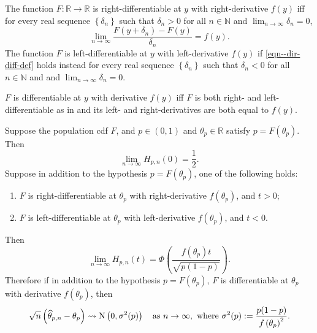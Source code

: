 \begin{definition}
\label{def--dir-diff}
The function \(F : \mathbb{R} \to \mathbb{R}\) is right-differentiable at
\(y\) with right-derivative \(f (y)\) iff for every real sequence \(\left\{
\delta_{n} \right\}\) such that \(\delta_{n} > 0\) for all \(n \in \mathbb{N}\)
and \(\lim_{n \to \infty} \delta_{n} = 0\),
\begin{equation}
  \lim_{n \to \infty} \frac{F \left( y + \delta_{n} \right) - F (y)}{\delta_{n}}
  = f (y).
  \label{eqn--dir-diff-def}
\end{equation}
The function \(F\) is left-differentiable at \(y\) with left-derivative \(f
(y)\) if \eqref{eqn--dir-diff-def} holds instead for every
real sequence \(\left\{ \delta_{n} \right\}\) such that \(\delta_{n} < 0\) for
all \(n \in \mathbb{N}\) and and \(\lim_{n \to \infty} \delta_{n} = 0\).
\end{definition}

\begin{remark}
\label{rem--diff-equiv-bi-dir-diff}
\(F\) is differentiable at \(y\) with derivative \(f (y)\) iff \(F\) is both
right- and left-differentiable as in  and its left- and
right-derivatives are both equal to \(f (y)\).
\end{remark}

\begin{theorem}
\label{thm--clt-quantile}
Suppose the population cdf \(F\), and \(p \in (0, 1)\) and \(\theta_{p} \in
\mathbb{R}\) satisfy \(p = F \left( \theta_{p} \right)\).
Then
\begin{equation}
  \lim_{n \to \infty} H_{p, n} (0) = \frac{1}{2}.
  \label{eqn--clt-quantile-0}
\end{equation}
Suppose in addition to the hypothesis \(p = F \left( \theta_{p} \right)\),
one of the following holds:
\begin{enumerate}[label=\roman*.]
  \item \(F\) is right-differentiable at \(\theta_{p}\) with right-derivative
    \(f \left( \theta_{p} \right)\), and \(t > 0\);
  \item \(F\) is left-differentiable at \(\theta_{p}\) with left-derivative \(f
    \left( \theta_{p} \right)\), and \(t < 0\).
\end{enumerate}
Then
\begin{equation}
  \lim_{n \to \infty} H_{p, n} (t) = \Phi \left( \frac{f \left( \theta_{p}
  \right) t}{\sqrt{p (1 - p)}} \right).
  \label{eqn--clt-quantile-non0}
\end{equation}
Therefore if in addition to the hypothesis \(p = F \left( \theta_{p} \right)\),
\(F\) is differentiable at \(\theta_{p}\) with derivative \(f \left( \theta_{p}
\right)\), then
\begin{equation}
  \sqrt{n} \left( \widehat{\theta}_{p, n} - \theta_{p} \right) \rightsquigarrow
  \mathrm{N} \left( 0, \sigma^{2} (p) \right) \quad \text{as } n \to \infty, \text{
  where } \sigma^{2} (p) := \frac{p (1 - p)}{f \left( \theta_{p} \right)^{2}}.
  \label{eqn--clt-quantile}
\end{equation}
\end{theorem}

